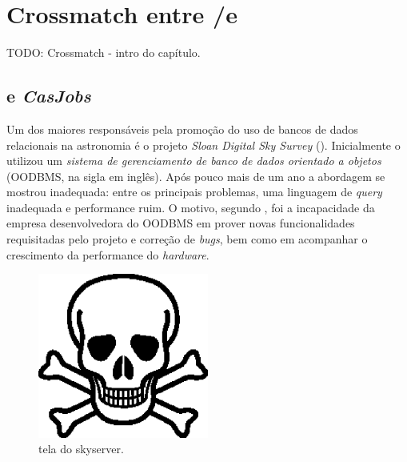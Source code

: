 


\chapter{Crossmatch entre \SDSS/\starlight e \galex}
\label{sec:Crossmatch}

TODO: Crossmatch - intro do capítulo.

\section{ e {\em CasJobs}}
Um dos maiores responsáveis pela promoção do uso de bancos de dados relacionais
na astronomia é o projeto {\em Sloan Digital Sky Survey} (\SDSS). Inicialmente o
\SDSS utilizou um {\em sistema de gerenciamento de banco de dados orientado a
objetos} (OODBMS, na sigla em inglês). Após pouco mais de um ano a abordagem se
mostrou inadequada: entre os principais problemas, uma linguagem de {\em query}
inadequada e performance ruim. O motivo, segundo \citet{Thakar2004}, foi a
incapacidade da empresa desenvolvedora do OODBMS em prover novas funcionalidades
requisitadas pelo projeto e correção de {\em bugs}, bem como em acompanhar o
crescimento da performance do {\em hardware}.

\begin{figure}
	\includegraphics[width=0.5\textwidth]{figuras/test.eps}
	\caption[Tela do skyserver.]
	{tela do skyserver.}
	\label{fig:TelaDoSkyServer}
\end{figure}


